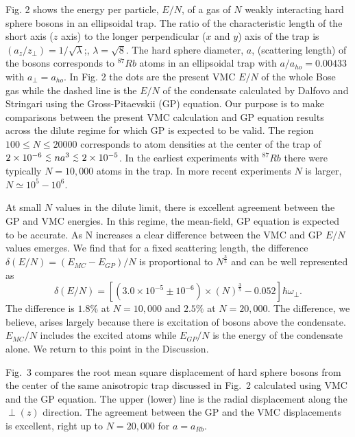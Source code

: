 \documentclass[aps,pra,twocolumn,groupedaddress]{revtex4}
\def\lapx{\lower 2pt \hbox{$\buildrel<\over{\scriptstyle{\sim}}$\ }}
\begin{document}
Fig. 2 shows the energy per particle, $E/N$, of a gas of $N$ weakly interacting
hard sphere bosons in an ellipsoidal trap. 
The ratio of the characteristic length of the short axis ($z$ axis) to the longer
perpendicular ($x$ and $y$) axis of the trap is $(a_z/z_\perp) = 1/\sqrt{\lambda}$;, 
$\lambda =\sqrt{8}$. 
The hard sphere diameter, $a$, (scattering length) of the bosons
corresponds to $^{87}Rb$ atoms in an ellipsoidal trap with
$a/a_{ho} = 0.00433$ with $a_\perp = a_{ho}$. 
In Fig. 2 the dots
are the present VMC $E/N$ of the whole Bose gas while the dashed line is the
$E/N$ of the condensate calculated by Dalfovo and Stringari\cite{dalfovo96}
using the Gross-Pitaevskii (GP) equation.  Our purpose is to make comparisons
between the present VMC calculation and GP equation results across the
dilute regime for which GP is expected to be valid.  The region $100 \leq N
\leq 20000$ corresponds to atom densities at the center of the trap of $2 \times
10^{-6}\ \lapx na^3\ \lapx 2 \times 10^{-5}$. In the earliest
experiments\cite{anderson95} with $^{87}Rb$ there were typically $N = 10,000$
atoms in the trap. In more recent experiments $N$ is larger, $N \simeq 10^5 -
10^6$.

At small $N$ values in the dilute limit, 
there is excellent
agreement between the GP and VMC energies. In this regime, the mean-field, GP
equation is expected to be accurate. 
As N increases a clear difference between the VMC and GP $E/N$
values emerges. We find that for a fixed scattering length, 
the difference $\delta(E/N) = (E_{MC}-E_{GP})/N$ is proportional to $N^{\frac{3}{5} }$ and 
can be well represented as
\begin{equation}
\delta(E/N) = [(3.0\times10^{-5} \pm 10^{-6}) \times (N)^{\frac{3}{5}} - 0.052]\hbar\omega_{\perp}.
\end{equation}
The difference is $1.8\%$ at $N=10,000$ and $2.5\%$ at $N=20,000$.
The difference, we believe, arises largely because there is excitation of bosons above
the condensate. $E_{MC}/N$ includes the excited atoms while
$E_{GP}/N$ is the energy of the condensate alone.
We return to this point in the Discussion.


Fig.~3 compares the root mean square displacement of hard sphere bosons from the
center of the same anisotropic trap discussed in Fig.~2 calculated using VMC and
the GP equation. The upper (lower) line is the radial displacement along the
$\perp (z)$ direction. The agreement between the GP and the VMC displacements is
excellent, right up to $N = 20,000$ for $a = a_{Rb}$.
\end{document}
